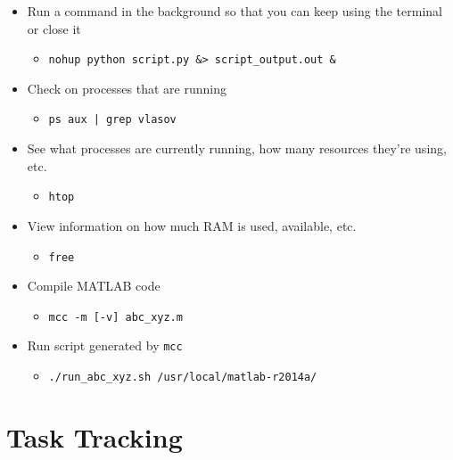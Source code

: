 \documentclass[11pt,a4paper]{report}
\begin{document}
\begin{itemize}

\item Run a command in the background so that you can keep using the terminal or close it
  \begin{itemize}
  \item \texttt{nohup python script.py \&> script\_output.out \&}
  \end{itemize}

\item Check on processes that are running
  \begin{itemize}
  \item \texttt{ps aux | grep vlasov}
  \end{itemize}

\item See what processes are currently running, how many resources they're using, etc.
  \begin{itemize}
  \item \texttt{htop}
  \end{itemize}

\item View information on how much RAM is used, available, etc.
  \begin{itemize}
  \item \texttt{free}
  \end{itemize}

\item Compile MATLAB code
  \begin{itemize}
  \item \texttt{mcc -m [-v] abc\_xyz.m}
  \end{itemize}

\item Run script generated by \texttt{mcc}
  \begin{itemize}
  \item \texttt{./run\_abc\_xyz.sh /usr/local/matlab-r2014a/}
  \end{itemize}

\end{itemize}


\section{Task Tracking}
\end{document}
